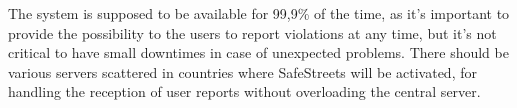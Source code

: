 The system is supposed to be available for 99,9\% of the time, as it's important to provide the possibility to the users to report violations at any time, but it's not critical to have small downtimes in case of unexpected problems. There should be various servers scattered in countries where SafeStreets will be activated, for handling the reception of user reports without overloading the central server.